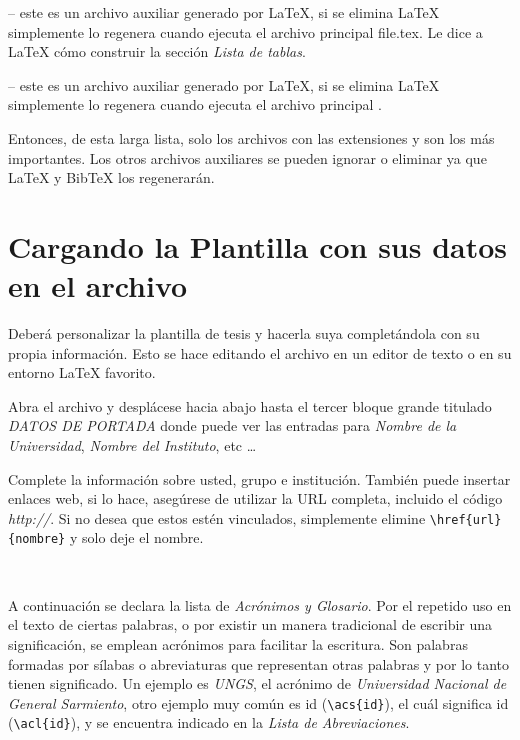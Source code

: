  -- este es un archivo auxiliar generado por \LaTeX{}, si se elimina \LaTeX{} simplemente lo regenera cuando ejecuta el archivo principal  file{.tex}. Le dice a \LaTeX{} cómo construir la sección \emph{Lista de tablas}.

 -- este es un archivo auxiliar generado por \LaTeX{}, si se elimina \LaTeX{} simplemente lo regenera cuando ejecuta el archivo principal  .

Entonces, de esta larga lista, solo los archivos con las extensiones   y  son los más importantes. Los otros archivos auxiliares se pueden ignorar o eliminar ya que \LaTeX{} y BibTeX los regenerarán.


\section{Cargando la Plantilla con sus datos en  el archivo  }\label{CargaArchivo}


Deberá personalizar la plantilla de tesis y hacerla suya completándola con  su propia información. Esto se hace editando el archivo  en un editor de texto o en su entorno \LaTeX{} favorito.

Abra el archivo y desplácese hacia abajo hasta el tercer bloque grande titulado \emph{DATOS DE PORTADA} donde puede ver las entradas para \emph{Nombre de la Universidad}, \emph{Nombre del Instituto}, etc \ldots

Complete la información sobre usted, grupo e institución. También puede insertar enlaces web, si lo hace, asegúrese de utilizar la URL completa, incluido el código \emph{http://}. Si no desea que estos estén vinculados, simplemente elimine \verb|\href{url}{nombre}| y solo deje el nombre.

\

A continuación se declara la lista de \emph{Acrónimos y Glosario}. Por el repetido uso en el texto de ciertas palabras, o por existir un manera tradicional de escribir una significación, se emplean acrónimos para facilitar la escritura. Son palabras formadas por sílabas o abreviaturas que representan otras palabras y por lo tanto tienen significado. Un ejemplo es \emph{UNGS}, el acrónimo de \emph{Universidad Nacional de General Sarmiento}, otro ejemplo muy común es  \acs{id} (\verb*|\acs{id}|), el cuál significa  \acl{id} (\verb*|\acl{id}|), y se encuentra indicado en la \emph{Lista de Abreviaciones}.  


